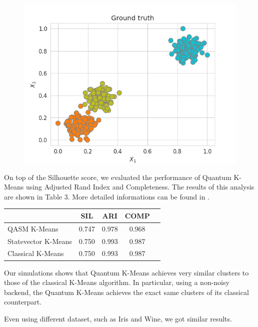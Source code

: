 \documentclass{article}
\begin{document}
\begin{multicols}{2}
\begin{figure}[H]
    \includegraphics[width=\linewidth]{assets/kmeans/gt.png}
\end{figure}


On top of the Silhouette score, we evaluated the performance of Quantum K-Means using Adjusted Rand Index and Completeness. The results of this analysis are shown in Table 3. More detailed informations can be found in \cite{metrics}.

\begin{center}
\begin{tabular}{lcccl}
\toprule
     &  SIL & ARI & COMP\\
     \midrule
     QASM K-Means & 0.747 & 0.978 & 0.968\\
     Statevector K-Means & 0.750 & 0.993 & 0.987\\
     Classical K-Means & 0.750 & 0.993 & 0.987 \\
     \bottomrule
    \end{tabular}
    \end{center}
    


    Our simulations shows that Quantum K-Means achieves very similar clusters to those of the classical K-Means algorithm.
In particular, using a non-noisy backend, the Quantum K-Means achieves the exact same clusters of its classical counterpart.

Even using different dataset, such as Iris and Wine, we got similar results.



\end{multicols}
\end{document}
